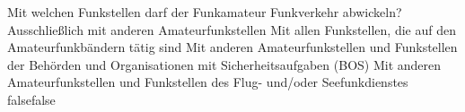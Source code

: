     {Mit welchen Funkstellen darf der Funkamateur Funkverkehr abwickeln?}
    {Ausschließlich mit anderen Amateurfunkstellen}
    {Mit allen Funkstellen, die auf den Amateurfunkbändern tätig sind}
    {Mit anderen Amateurfunkstellen und Funkstellen der Behörden und Organisationen mit Sicherheitsaufgaben (BOS)}
    {Mit anderen Amateurfunkstellen und Funkstellen des Flug- und/oder Seefunkdienstes}
    {false}{false}